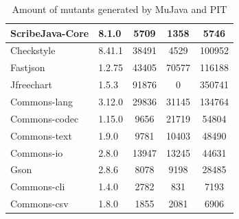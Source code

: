\documentclass[conference,draftclsnofoot,onecolumn]{IEEEtran}
\begin{document}
\begin{table}[ht]
\begin{tabular}{|l|l|c|c|c|}
ScribeJava-Core                 & 8.1.0            & 5709                                                                   & 1358                                 & 5746                              \\ \hline
Checkstyle                      & 8.41.1           & 38491                                                                  & 4529                                 & 100952                            \\ \hline
Fastjson                        & 1.2.75           & 43405                                                                  & 70577                                & 116188                            \\ \hline
Jfreechart                      & 1.5.3            & 91876                                                                  & 0                                    & 350741                            \\ \hline
Commons-lang                    & 3.12.0           & 29836                                                                  & 31145                                & 134764                            \\ \hline
Commons-codec                   & 1.15.0           & 9656                                                                   & 21719                                & 54804                            \\ \hline
Commons-text                   & 1.9.0             & 9781                                                                   & 10403                                & 48490                            \\ \hline
Commons-io                     & 2.8.0             & 13947                                                                  & 13245                                & 44631                            \\ \hline
Gson                           & 2.8.6             & 8078                                                                   & 9198                                 & 28485                            \\ \hline
Commons-cli                    & 1.4.0             & 2782                                                                   & 831                                  & 7193                             \\ \hline
Commons-csv                    & 1.8.0             & 1855                                                                   & 2081                                 & 6906                             \\ \hline
\end{tabular}
\caption{\label{tab:mutants-generated}Amount of mutants generated by MuJava and PIT}
\end{table}
\end{document}
